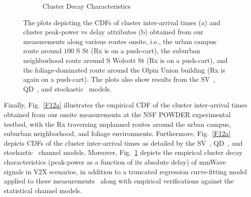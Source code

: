 \documentclass[12pt, draftcls, onecolumn]{IEEEtran}
\begin{document}
{\begin{figure} [t]
\begin{subfigure}{0.495\linewidth}
        \caption{Cluster Decay Characteristics}
        \label{F12b}
    \end{subfigure}
    \vspace{-8mm}
    \caption{The plots depicting the CDFs of cluster inter-arrival times (a) and cluster peak-power vs delay attributes (b) obtained from our measurements along various routes onsite, i.e., the urban campus route around $100$ S St (Rx is on a push-cart), the suburban neighborhood route around S Wolcott St (Rx is on a push-cart), and the foliage-dominated route around the Olpin Union building (Rx is again on a push-cart). The plots also show results from the SV~\cite{SV_Molisch}, QD~\cite{QDC_NIST}, and stochastic~\cite{Indoor60G} models.}
    \label{F12}
\end{figure}

Finally, Fig.~\ref{F12a} illustrates the empirical CDF of the cluster inter-arrival times obtained from our onsite measurements at the NSF POWDER experimental testbed, with the Rx traversing unplanned routes around the urban campus, suburban neighborhood, and foliage environments. Furthermore, Fig.~\ref{F12a} depicts CDFs of the cluster inter-arrival times as detailed by the SV~\cite{SV_Molisch}, QD~\cite{QDC_NIST}, and stochastic~\cite{Indoor60G} channel models. Moreover, Fig.~\ref{F12b} depicts the empirical cluster decay characteristics (peak-power as a function of its absolute delay) of mmWave signals in V$2$X scenarios, in addition to a truncated regression curve-fitting model applied to these measurements~\cite{Indoor60G} along with empirical verifications against the statistical channel models.
\vspace{-3mm}

}
\end{document}
